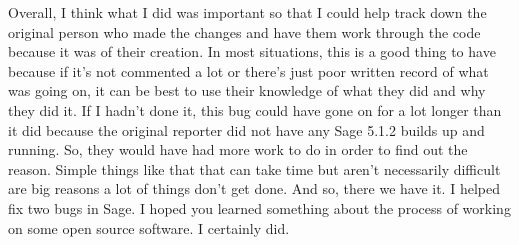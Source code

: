 \documentclass{article}
\begin{document}
Overall, I think what I did was important so that I could help track down the original person who made the changes and have them work through the code because it was of their creation. In most situations, this is a good thing to have because if it's not commented a lot or there's just poor written record of what was going on, it can be best to use their knowledge of what they did and why they did it. If I hadn't done it, this bug could have gone on for a lot longer than it did because the original reporter did not have any Sage 5.1.2 builds up and running. So, they would have had more work to do in order to find out the reason. Simple things like that that can take time but aren't necessarily difficult are big reasons a lot of things don't get done. And so, there we have it. I helped fix two bugs in Sage. I hoped you learned something about the process of working on some open source software. I certainly did.
\end{document}
